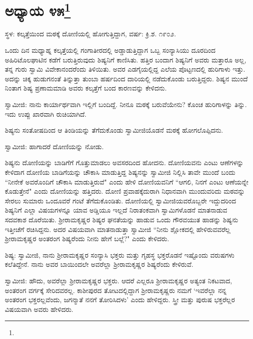 \newpage

\chapter[ಅಧ್ಯಾಯ ೪೫]{ಅಧ್ಯಾಯ ೪೫\protect\footnote{}}

\centerline{ಸ್ಥಳ: ಕಲ್ಕತ್ತೆಯಿಂದ ಮಠಕ್ಕೆ ದೋಣಿಯಲ್ಲಿ ಹೋಗುತ್ತಿದ್ದಾಗ, ವರ್ಷ: ಕ್ರಿ.ಶ. ೧೯೦೨.}

ಒಂದು ದಿನ ಮಧ್ಯಾಹ್ನ ಕಲ್ಕತ್ತೆಯಲ್ಲಿ ಗಂಗಾತೀರದಲ್ಲಿ ಅಡ್ಡಾಡುತ್ತಿದ್ದಾಗ ಒಬ್ಬ ಸಂನ್ಯಾಸಿಯು ದೂರದಿಂದ ಅಹಿರಿಟೊಲಘಾಟಿನ ಕಡೆಗೆ ಬರುತ್ತಿರುವುದು ಶಿಷ್ಯನಿಗೆ ಕಾಣಿಸಿತು. ಹತ್ತಿರ ಬಂದಾಗ ಶಿಷ್ಯನಿಗೆ ಅವರು ಮತ್ತಾರೂ ಅಲ್ಲ, ತನ್ನ ಗುರು ಸ್ವಾಮಿ ವಿವೇಕಾನಂದರೆಂದು ತಿಳಿಯಿತು. ಅವರ ಎಡಗೈಯಲ್ಲಿದ್ದ ಎಲೆಯ ಪೊಟ್ಟಣದಲ್ಲಿ ಹುರಿಗಾಳು ಇತ್ತು. ಅದನ್ನು ಚಿಕ್ಕ ಹುಡುಗನಂತೆ ತಿನ್ನುತ್ತಾ ತುಂಬಾ ಹರ್ಷದಿಂದ ದಾರಿಯಲ್ಲಿ ನಡೆದುಕೊಂಡು ಬರುತ್ತಿದ್ದರು. ಶಿಷ್ಯನ ಮುಂದೆ ನಿಂತಾಗ ಶಿಷ್ಯ ಪ್ರಣಾಮಮಾಡಿ ಅವರು ಕಲ್ಕತ್ತೆಗೆ ಬಂದ ಕಾರಣವನ್ನು ಕೇಳಿದನು.

ಸ್ವಾಮೀಜಿ: ನಾನು ಕಾರ್ಯಾರ್ಥವಾಗಿ ಇಲ್ಲಿಗೆ ಬಂದಿದ್ದೆ. ನೀನೂ ಮಠಕ್ಕೆ ಬರುವೆಯೇನು? ಕೊಂಚ ಹುರಿಗಾಳನ್ನು ತಿನ್ನು. ಇದು ಉಪ್ಪು ಖಾರವಾಗಿ ರುಚಿಯಾಗಿದೆ.

ಶಿಷ್ಯನು ಸಂತೋಷದಿಂದ ಆ ತಿಂಡಿಯನ್ನು ತೆಗೆದುಕೊಂಡು ಸ್ವಾಮೀಜಿಯೊಡನೆ ಮಠಕ್ಕೆ ಹೋಗಲೊಪ್ಪಿದನು.

ಸ್ವಾಮೀಜಿ: ಹಾಗಾದರೆ ದೋಣಿಯನ್ನು ನೋಡು.

ಶಿಷ್ಯನು ದೋಣಿಯನ್ನು ಬಾಡಿಗೆಗೆ ಗೊತ್ತುಮಾಡಲು ಅವಸರದಿಂದ ಹೋದನು. ದೋಣಿಯವನು ಎಂಟು ಆಣೆಗಳನ್ನು ಕೇಳಿದಾಗ ದೋಣಿಯ ಬಾಡಿಗೆಯನ್ನು ಚೌಕಾಸಿ ಮಾಡುತ್ತಿದ್ದ ಶಿಷ್ಯನನ್ನು ಸ್ವಾಮೀಜಿ ನಿಲ್ಲಿಸಿ ತಾವೇ ಮುಂದೆ ಬಂದು “ನೀನೇಕೆ ಅವರೊಂದಿಗೆ ಚೌಕಾಸಿ ಮಾಡುತ್ತಿರುವೆ" ಎಂದು ಹೇಳಿ ದೋಣಿಯವನಿಗೆ “ಆಗಲಿ, ನಿನಗೆ ಎಂಟು ಆಣೆಯನ್ನೇ ಕೊಡುತ್ತೇನೆ" ಎಂದು ದೋಣಿಯನ್ನು ಹತ್ತಿದರು. ದೋಣಿ ಪ್ರವಾಹಕ್ಕೆದುರಾಗಿ ನಿಧಾನವಾಗಿ ಮುಂದುವರಿದು ಮಠವನ್ನು ಸೇರಲು ಸುಮಾರು ಒಂದೂವರೆ ಗಂಟೆ ತೆಗೆದುಕೊಂಡಿತು. ದೋಣಿಯಲ್ಲಿ ಸ್ವಾಮೀಜಿಯವರೊಬ್ಬರೇ ಇದ್ದುದರಿಂದ ಶಿಷ್ಯನಿಗೆ ಎಲ್ಲಾ ವಿಷಯಗಳನ್ನೂ ಯಾವ ಅಡ್ಡಿಯೂ ಇಲ್ಲದೆ ನಿರಾತಂಕವಾಗಿ ಸ್ವಾಮಿಗಳೊಡನೆ ಮಾತನಾಡುವ ಸದವಕಾಶ ದೊರೆಯಿತು. ಶ‍್ರೀರಾಮಕೃಷ್ಣರ ಶಿಷ್ಯರ ಘನತೆಯನ್ನು ಹಾಡುವ ಒಂದು ಗೌರವಯುತ ಹಾಡನ್ನು ಶಿಷ್ಯನು ಇತ್ತೀಚೆಗೆ ರಚಿಸಿದ್ದನು. ಅದರ ವಿಷಯವಾಗಿ ಮಾತನಾಡುತ್ತಾ ಸ್ವಾಮೀಜಿ “ನೀನು ಶ್ಲೋಕದಲ್ಲಿ ಹೇಳಿರುವವರೆಲ್ಲ ಶ‍್ರೀರಾಮಕೃಷ್ಣರ ಅಂತರಂಗ ಶಿಷ್ಯರೆಂದು ನೀನು ಹೇಗೆ ಬಲ್ಲೆ?" ಎಂದು ಕೇಳಿದರು.

ಶಿಷ್ಯ: ಸ್ವಾಮೀಜಿ, ನಾನು ಶ‍್ರೀರಾಮಕೃಷ್ಣರ ಸಂನ್ಯಾಸಿ ಭಕ್ತರು ಮತ್ತು ಗೃಹಸ್ಥ ಭಕ್ತರೊಡನೆ ಇಷ್ಟೊಂದು ವರುಷಗಳು ಕಲೆತಿದ್ದೇನೆ. ನಾನು ಅವರ ಬಾಯಿಂದಲೇ ಅವರೆಲ್ಲಾ ಶ‍್ರೀರಾಮಕೃಷ್ಣರ ಶಿಷ್ಯರೆಂದು ಕೇಳಿರುವೆ.

ಸ್ವಾಮೀಜಿ: ಹೌದು, ಅವರೆಲ್ಲಾ ಶ‍್ರೀರಾಮಕೃಷ್ಣರ ಭಕ್ತರು. ಆದರೆ ಎಲ್ಲರೂ ಶ‍್ರೀರಾಮಕೃಷ್ಣರ ಅತ್ಯಂತ ನಿಕಟವಾದ, ಅಂತರಂಗ ವರ್ಗಕ್ಕೆ ಸೇರಿದವರಲ್ಲ. ಕಾಶೀಪುರದ ತೋಟದಲ್ಲಿದ್ದಾಗ ಶ‍್ರೀರಾಮಕೃಷ್ಣರು ನಮಗೆ ‘ಇವರೆಲ್ಲಾ ನನ್ನ ಅಂತರಂಗ ಭಕ್ತರಲ್ಲವೆಂದು, ಜಗನ್ಮಾತೆ ನನಗೆ ತೋರಿಸಿದಳು’ ಎಂದು ಹೇಳಿದ್ದರು. ಸ್ತ್ರೀ ಮತ್ತು ಪುರುಷ ಭಕ್ತರೆಲ್ಲರ ವಿಷಯವಾಗಿ ಅವರು ಹೇಳಿದರು.

